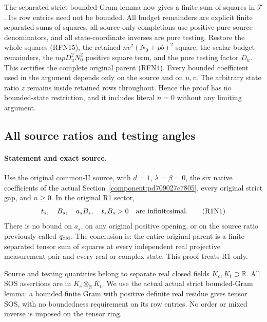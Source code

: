 The separated strict bounded-Gram lemma now gives a finite sum of
squares in $\mathcal T$.  Its row entries need not be bounded.  All
budget remainders are explicit finite separated sums of squares, all
source-only completions use positive pure source denominators, and
all state-coordinate inverses are pure testing.  Restore the whole
squares (RFN15), the retained $nv^2(N_0+pb)^2$ square, the scalar
budget remainders, the $mpD_u^2N_0^2$ positive square term, and the pure testing
factor $D_u$.  This certifies the complete original parent (RFN4).
Every bounded coefficient used in the argument depends only on the
source and on $u,v$.  The arbitrary state ratio $z$ remains inside
retained rows throughout.  Hence the proof has no bounded-state
restriction, and it includes literal $n=0$ without any limiting
argument.

\subsection{All source ratios and testing angles}
\label{component:pbaab204a8ab1}

\label{pbaab204a8ab1:sec:new-r1-all-tests}

\paragraph{Statement and exact source.}
Use the original common-II source, with $d=1$, $\lambda=\beta=0$,
the six native coefficients of the actual
Section~\ref{component:pd709027c7805}, every original strict gap,
and $n\geq0$.  In the original R1 sector,
\[
 t_s,\quad B_s,\quad a_sB_s,\quad t_sB_s>0
 \quad\hbox{are infinitesimal}.                         \tag{R1N1}
\]
There is no bound on $a_s$, on any original positive opening, or on
the source ratio previously called $q_{\rm old}$.  The conclusion is:
the entire original parent is a finite separated tensor sum of
squares at every independent real projective measurement pair and
every real or complex state.  This proof treats R1 only.

Source and testing quantities belong to separate real closed fields
$K_c,K_t\supset\mathbb R$.  All SOS assertions are in
$K_c\otimes_{\mathbb R}K_t$.  We use the actual actual strict
bounded-Gram lemma: a bounded finite Gram with positive definite
real residue gives tensor SOS, with no boundedness requirement on
its row entries.  No order or mixed inverse is imposed on the
tensor ring.

